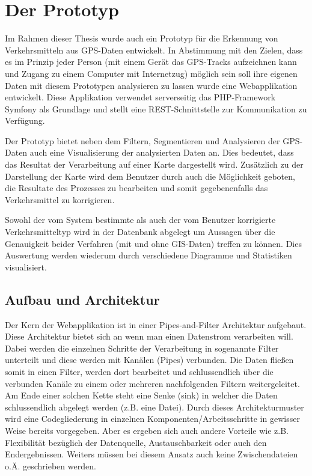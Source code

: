\chapter{Der Prototyp}

Im Rahmen dieser Thesis  wurde auch ein Prototyp für die Erkennung von Verkehrsmitteln aus GPS-Daten entwickelt. In Abstimmung mit den Zielen, dass es im Prinzip jeder Person (mit einem Gerät das GPS-Tracks aufzeichnen kann und Zugang zu einem Computer mit Internetzug) möglich sein soll ihre eigenen Daten mit diesem Prototypen analysieren zu lassen wurde eine Webapplikation entwickelt. Diese Applikation verwendet serverseitig das PHP-Framework Symfony als Grundlage und stellt eine REST-Schnittstelle zur Kommunikation zu Verfügung.

Der Prototyp bietet neben dem Filtern, Segmentieren und Analysieren der GPS-Daten auch eine Visualisierung der analysierten Daten an. Dies bedeutet, dass das Resultat der Verarbeitung auf einer Karte dargestellt wird. Zusätzlich zu der Darstellung der Karte wird dem Benutzer durch auch die Möglichkeit geboten, die Resultate des Prozesses zu bearbeiten und somit gegebenenfalls das Verkehrsmittel zu korrigieren. 

Sowohl der vom System bestimmte als auch der vom Benutzer  korrigierte Verkehrsmitteltyp wird in der Datenbank abgelegt um Aussagen über die Genauigkeit beider Verfahren (mit und ohne GIS-Daten) treffen zu können. Dies Auswertung werden wiederum durch verschiedene Diagramme und Statistiken visualisiert.
\clearpage

\section{Aufbau und Architektur}
Der Kern der Webapplikation ist in einer Pipes-and-Filter Architektur aufgebaut. Diese Architektur bietet sich an wenn man einen Datenstrom verarbeiten will. Dabei werden die einzelnen Schritte der Verarbeitung in sogenannte Filter unterteilt und diese werden mit Kanälen (Pipes) verbunden. Die Daten fließen somit in einen Filter, werden dort bearbeitet und schlussendlich über die verbunden Kanäle zu einem oder mehreren nachfolgenden Filtern weitergeleitet. Am Ende einer solchen Kette steht eine Senke (sink) in welcher die Daten schlussendlich abgelegt werden (z.B. eine Datei). Durch dieses Architekturmuster wird eine Codegliederung in einzelnen Komponenten/Arbeitsschritte in gewisser Weise bereits vorgegeben. Aber es ergeben sich auch andere Vorteile wie z.B. Flexibilität bezüglich der Datenquelle, Austauschbarkeit oder auch den Endergebnissen. Weiters müssen bei diesem Ansatz auch keine Zwischendateien o.Ä. geschrieben werden. \cite{buschmann_pipes_1998} 

